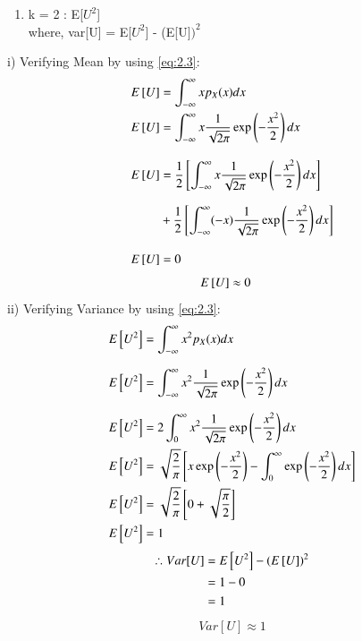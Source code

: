 \documentclass[journal,12pt,twocolumn]{IEEEtran}
\renewcommand\thesection{\arabic{section}}
\begin{document}
\begin{enumerate}[label=\textbf{\thesection.\arabic*},ref=\thesection.\theenumi]
\begin{enumerate}
   		\item k = 2 : E[$U^2$] \\[9pt]
    		where, var[U] = E[$U^2$] - (E[U$])^2$\\
	\end{enumerate}
i) Verifying Mean by using \eqref{eq:2.3}:
    \begin{align*}
    		E{}\left[U\right] &= \int_{-\infty}^{\infty} x p_X(x)dx\\
    		E{}\left[U\right] &= \int_{-\infty}^{\infty} x \frac{1} {\sqrt{2\pi}} \exp\left(-\frac{x^2}{2}\right) dx \\[9pt]
   		E{}\left[U\right] &= \dfrac{1}{2} {}\left[ \int_{-\infty}^{\infty} x \frac{1} {\sqrt{2\pi}} \exp\left(-\frac{x^2}{2}\right) dx\right] \\[7pt] &+ \dfrac{1}{2} {}\left[\int_{-\infty}^{\infty} (-x) \frac{1}{\sqrt{2\pi}} \exp\left(-\frac{x^2}{2}\right) dx\right]\\[9pt]
   		E{}\left[U\right] &= 0
    \end{align*}
%
	\begin{align}
        E{}\left[U\right] &\approx 0
	\end{align}
%
ii) Verifying Variance by using \eqref{eq:2.3}:
	\begin{align*}
    	 E{}\left[U^2\right] &= \int_{-\infty}^{\infty} x^2 p_X(x) dx\\[7pt]
    	 E{}\left[U^2\right] &= \int_{-\infty}^{\infty} x^2 \frac{1}{\sqrt{2\pi}}\exp\left(-\frac{x^2}{2}\right) dx \\[7pt]
     E{}\left[U^2\right] &= 2\int_{0}^{\infty} x^2 \frac{1}{\sqrt{2\pi}}\exp\left(-\frac{x^2}{2}\right) dx \\
     E{}\left[U^2\right] &= \sqrt{\frac{2}{\pi}} {}\left[x \exp\left(-\frac{x^2}{2}\right) - \int_{0}^{\infty}\exp\left( -\frac{x^2}{2}\right) dx\right]\\
     E{}\left[U^2\right] &= \sqrt{\frac{2}{\pi}} {}\left[0 + \sqrt{\frac{\pi}{2}}\right]\\
     E{}\left[U^2\right] &= 1
     \end{align*}	
%	
	\begin{align*}
        \therefore Var[U] &=  E{}\left[U^2\right] -  (E{}\left[U\right])^2\\
        &= 1 - 0\\
        &=1
	\end{align*}
%	
	\begin{align}
    		Var[U] \approx 1
	\end{align}
\end{enumerate}
\end{document}
